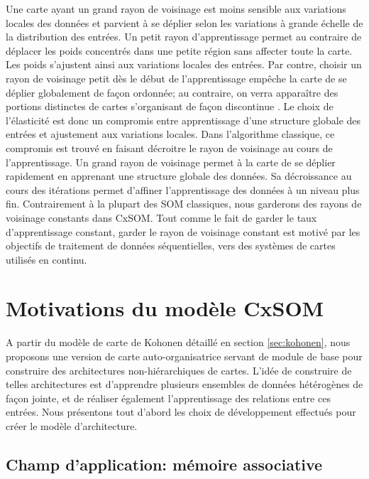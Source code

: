 \documentclass[../main]{subfiles}
\begin{document}
Une carte ayant un grand rayon de voisinage est moins sensible aux variations locales des données et parvient à se déplier selon les variations à grande échelle de la distribution des entrées.
Un petit rayon d'apprentissage permet au contraire de déplacer les poids concentrés dans une petite région sans affecter toute la carte. Les poids s'ajustent ainsi aux variations locales des entrées. Par contre, choisir un rayon de voisinage petit dès le début de l'apprentissage empêche la carte de se déplier globalement de façon ordonnée; au contraire, on verra apparaître des portions distinctes de cartes s'organisant de façon discontinue \parencite{Kohonen1995SelfOrganizingM}.
Le choix de l'élasticité est donc un compromis entre apprentissage d'une structure globale des entrées et ajustement aux variations locales.
Dans l'algorithme classique, ce compromis est trouvé en faisant décroitre le rayon de voisinage au cours de l'apprentissage. Un grand rayon de voisinage permet à la carte de se déplier rapidement en apprenant une structure globale des données. Sa décroissance au cours des itérations permet d'affiner l'apprentissage des données à un niveau plus fin. 
Contrairement à la plupart des SOM classiques, nous garderons des rayons de voisinage constants dans CxSOM. Tout comme le fait de garder le taux d'apprentissage constant, garder le rayon de voisinage constant est motivé par les objectifs de traitement de données séquentielles, vers des systèmes de cartes utilisés en continu.

\section{Motivations du modèle CxSOM}

A partir du modèle de carte de Kohonen détaillé en section \ref{sec:kohonen}, nous proposons une version de carte auto-organisatrice servant de module de base pour construire des architectures non-hiérarchiques de cartes. 
L'idée de construire de telles architectures est d'apprendre plusieurs ensembles de données hétérogènes de façon jointe, et de réaliser également l'apprentissage des relations entre ces entrées.
Nous présentons tout d'abord les choix de développement effectués pour créer le modèle d'architecture.

\subsection{Champ d'application: mémoire associative}
\end{document}
